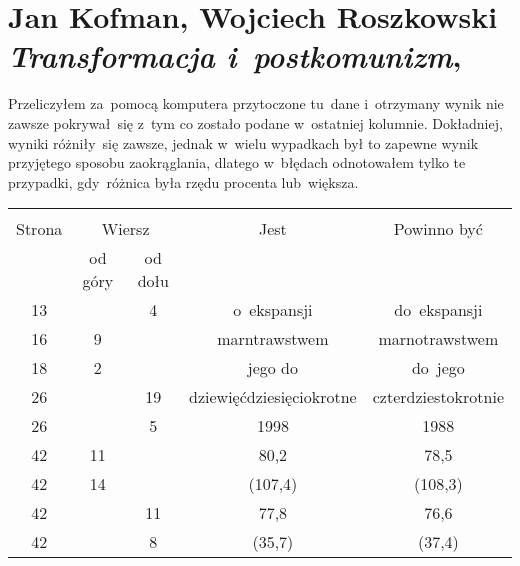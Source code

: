 \documentclass[a4paper,11pt]{article}
\numberwithin{equation}{section}
\begin{document}
\VerSpaceTwo



\section{Jan Kofman, Wojciech Roszkowski \\
  \textit{Transformacja i~postkomunizm},
  \cite{KofmanRoszkowskiTransformacjaIPostkomunizm1999} }




 Przeliczyłem za~pomocą komputera przytoczone tu~dane
i~otrzymany wynik nie zawsze pokrywał~się z~tym co zostało podane
w~ostatniej kolumnie. Dokładniej, wyniki różniły~się zawsze, jednak
w~wielu wypadkach był to zapewne wynik przyjętego sposobu
zaokrąglania, dlatego w~błędach odnotowałem tylko te przypadki,
gdy~różnica była rzędu procenta lub~większa.

\VerSpaceTwo




\begin{center}

  \begin{tabular}{|c|c|c|c|c|}
    \hline
    & \multicolumn{2}{c|}{} & & \\
    Strona & \multicolumn{2}{c|}{Wiersz} & Jest
                              & Powinno być \\ \cline{2-3}
    & od góry & od dołu & & \\
    \hline
    13  & &  4 & o~ekspansji & do~ekspansji \\
    16  &  9 & & marntrawstwem & marnotrawstwem \\
    18  &  2 & & jego do & do~jego \\
    26  & & 19 & dziewięćdziesięciokrotne & czterdziestokrotnie \\
    26  & &  5 & 1998 & 1988 \\
    42  & 11 & & 80,2 & 78,5 \\
    42  & 14 & & (107,4) & (108,3) \\
    42  & & 11 & 77,8 &  76,6 \\
    42  & &  8 & (35,7) & (37,4) \\
    \hline
  \end{tabular}

\end{center}
\end{document}
